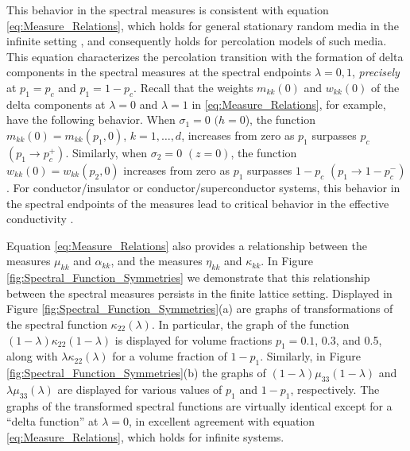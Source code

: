 \documentclass{cmslatex}
\begin{document}
This behavior in the spectral measures is consistent with equation
\eqref{eq:Measure_Relations}, which holds for general stationary
random media in the infinite setting \cite{Murphy:JMP:063506}, and
consequently holds for percolation models of such media. This equation
characterizes the percolation transition with the
formation of delta components in the spectral measures at the spectral
endpoints $\lambda=0,1$, \emph{precisely} at $p_1=p_c$ and
$p_1=1-p_c$. Recall that the weights $m_{kk}(0)$ and $w_{kk}(0)$ of
the delta components at $\lambda=0$ and $\lambda=1$ in
\eqref{eq:Measure_Relations}, for example, have the following
behavior. When $\sigma_1=0$ $(h=0$), the function
$m_{kk}(0)=m_{kk}(p_1,0)$, $k=1,\ldots,d$, increases from zero as 
$p_1$ surpasses $p_c$ $(p_1\to p_c^+)$. Similarly, when $\sigma_2=0$
$(z=0)$, the function 
$w_{kk}(0)=w_{kk}(p_2,0)$ increases from zero as $p_1$ surpasses
$1-p_c$ $(p_1\to1-p_c^-)$. For conductor/insulator or
conductor/superconductor systems, this behavior in the spectral
endpoints of the measures lead to critical behavior in the effective
conductivity \cite{Murphy:JMP:063506,Golden:JMP-5627}. 




Equation \eqref{eq:Measure_Relations} also provides a relationship
between the measures $\mu_{kk}$ and $\alpha_{kk}$, and the measures $\eta_{kk}$ and
$\kappa_{kk}$. In Figure \ref{fig:Spectral_Function_Symmetries} we
demonstrate that this relationship between the spectral measures
persists in the finite lattice setting. Displayed in Figure
\ref{fig:Spectral_Function_Symmetries}(a) are graphs of 
transformations of the spectral function $\kappa_{22}(\lambda)$. In particular,
the graph of the function $(1-\lambda)\kappa_{22}(1-\lambda)$ is displayed for
volume fractions $p_1=0.1$, 0.3, and 0.5, along with $\lambda\kappa_{22}(\lambda)$ for
a volume fraction of $1-p_1$. Similarly, in Figure
\ref{fig:Spectral_Function_Symmetries}(b) the graphs of
$(1-\lambda)\mu_{33}(1-\lambda)$ and $\lambda\mu_{33}(\lambda)$ are displayed for various values
of $p_1$ and $1-p_1$, respectively. The graphs of the 
transformed spectral functions are virtually identical except for a
``delta function'' at $\lambda=0$, in excellent agreement with equation
\eqref{eq:Measure_Relations}, which holds for infinite systems.
\end{document}
